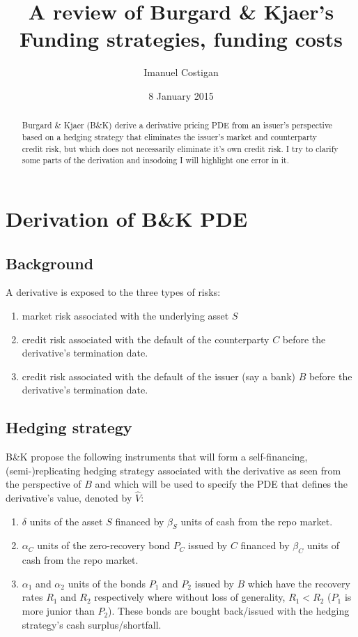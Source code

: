 \documentclass{tufte-handout}
\title{A review of Burgard \& Kjaer's Funding strategies, funding costs}
\author{Imanuel Costigan}
\date{8 January 2015}  %
\begin{document}
\maketitle%

\begin{abstract}
\noindent Burgard \& Kjaer (B\&K) \cite{bkfunding2013up} derive a derivative
pricing PDE from an issuer's perspective based on a hedging strategy that
eliminates the issuer's market and counterparty credit risk, but which does not
necessarily eliminate it's own credit risk. I try to clarify some parts of the
derivation and insodoing I will highlight one error in it.
\end{abstract}

\section{Derivation of B\&K PDE}\label{sec:derivation}

\subsection{Background}

A derivative is exposed to the three types of risks:

\begin{enumerate}
\item market risk associated with the underlying asset $S$
\item credit risk associated with the default of the counterparty $C$ before the
derivative's termination date.
\item credit risk associated with the default of the issuer (say a bank) $B$
before the derivative's termination date.
\end{enumerate}

\subsection{Hedging strategy}\label{sec:dynhedging}

B\&K propose the following instruments that will form a
self-financing, (semi-)replicating hedging strategy associated with the
derivative as seen from the perspective of $B$ and which will be used to
specify the PDE that defines the derivative's value, denoted by $\hat{V}$:

\begin{enumerate}
\item $\delta$ units of the asset $S$ financed by $\beta_S$ units of cash
from the repo market.
\item $\alpha_C$ units of the zero-recovery bond $P_C$ issued by $C$ financed
by $\beta_C$ units of cash from the repo market.
\item $\alpha_1$ and $\alpha_2$ units of the bonds $P_1$ and $P_2$ issued
by $B$ which have the recovery rates $R_1$ and $R_2$ respectively where
without loss of generality, $R_1 < R_2$ ($P_1$ is more junior than $P_2$).
These bonds are bought back/issued with the hedging strategy's cash
surplus/shortfall.
\end{enumerate}
\end{document}
